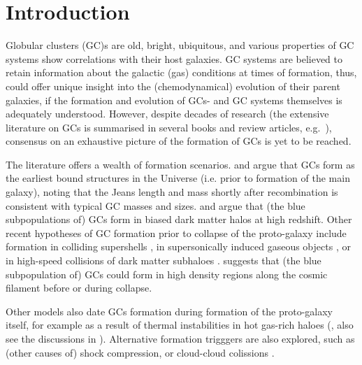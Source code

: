 \documentclass[a4paper,fleqn,usenatbib]{mnras}
\begin{document}
\section{Introduction}
Globular clusters (GC)s are old, bright, ubiquitous, and various properties of
GC systems show correlations with their host galaxies. GC systems are believed to
retain information about the galactic (gas) conditions at times of formation,
thus, could offer unique insight into the (chemodynamical) evolution of their 
parent galaxies, if the formation and evolution of GCs- and GC systems themselves 
is adequately understood. However, despite decades of research (the extensive 
literature on GCs is summarised in several books and review articles, e.g.~\citealt{
1991ARA&A..29..543H, Harris2001, 2004Natur.427...31W, 2006ARA&A..44..193B, 
2012A&ARv..20...50G, 2014CQGra..31x4006K, 2018RSPSA.47470616F}), consensus on an 
exhaustive picture of the formation of GCs is yet to be reached.

The literature offers a wealth of formation scenarios. \citet{1968ApJ...154..891P}
and \citet{1984ApJ...277..470P} argue that GCs form as the earliest bound
structures in the Universe (i.e. prior to formation of the main galaxy), 
noting that the Jeans length and mass shortly after recombination is consistent
with typical GC masses and sizes. \citet{2005MNRAS.364..367D} and \citet{
2009ApJ...706L.192B} argue that (the blue subpopulations of) GCs form in biased 
dark matter halos at high redshift. Other recent hypotheses of GC formation prior 
to collapse of the proto-galaxy include formation in colliding supershells 
\citep{2017Ap&SS.362..183R}, in supersonically induced gaseous objects
\citep{2019arXiv190408941C}, or in high-speed collisions of dark matter subhaloes
\citep{2019arXiv190508951M}. \citet{2017MNRAS.472.3120B} suggests
that (the blue subpopulation of) GCs could form in high density regions along
the cosmic filament before or during collapse.

Other models also date GCs formation during formation of the proto-galaxy itself,
for example as a result of thermal instabilities in hot gas-rich haloes 
(\citealt{1985ApJ...298...18F}, also see the discussions in \citealt{
1990ApJ...363..488K}). Alternative formation trigggers are also explored, such as 
(other causes of) shock compression, or cloud-cloud colissions \citep[e.g.][]{
1980glcl.conf..301G, 1992ApJ...400..265M, 1994ApJ...429..177H, 1995ApJ...442..618V,
1996ASPC...92..241L, 2001ApJ...560..592C}. 
\end{document}
